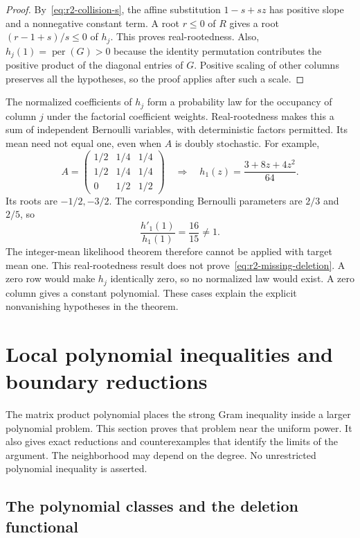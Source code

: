 \documentclass[11pt,a4paper]{article}
\theoremstyle{definition}
\theoremstyle{remark}
\newcommand{\per}{\operatorname{per}}
\begin{document}
\begin{proof}
By~\eqref{eq:r2-collision-s}, the affine substitution $1-s+sz$ has positive slope and a nonnegative constant term.
A root $r\le0$ of $R$ gives a root $(r-1+s)/s\le0$ of $h_j$.
This proves real-rootedness.
Also, $h_j(1)=\per(G)>0$ because the identity permutation contributes the positive product of the diagonal entries of $G$.
Positive scaling of other columns preserves all the hypotheses, so the proof applies after such a scale.
\end{proof}

The normalized coefficients of $h_j$ form a probability law for the occupancy of column $j$ under the factorial coefficient weights.
Real-rootedness makes this a sum of independent Bernoulli variables, with deterministic factors permitted.
Its mean need not equal one, even when $A$ is doubly stochastic.
For example,
\[
 A=\begin{pmatrix}
 1/2&1/4&1/4\\1/2&1/4&1/4\\0&1/2&1/2
 \end{pmatrix}
 \quad\Longrightarrow\quad
 h_1(z)=\frac{3+8z+4z^2}{64}.
\]
Its roots are $-1/2,-3/2$.
The corresponding Bernoulli parameters are $2/3$ and $2/5$, so
\[
 \frac{h'_1(1)}{h_1(1)}=\frac{16}{15}\ne1.
\]
The integer-mean likelihood theorem therefore cannot be applied with target mean one.
This real-rootedness result does not prove~\eqref{eq:r2-missing-deletion}.
A zero row would make $h_j$ identically zero, so no normalized law would exist.
A zero column gives a constant polynomial.
These cases explain the explicit nonvanishing hypotheses in the theorem.


\section{Local polynomial inequalities and boundary reductions}\label{sec:local-polynomial}

The matrix product polynomial places the strong Gram inequality inside a larger polynomial problem.
This section proves that problem near the uniform power.
It also gives exact reductions and counterexamples that identify the limits of the argument.
The neighborhood may depend on the degree.
No unrestricted polynomial inequality is asserted.

\subsection{The polynomial classes and the deletion functional}
\end{document}
